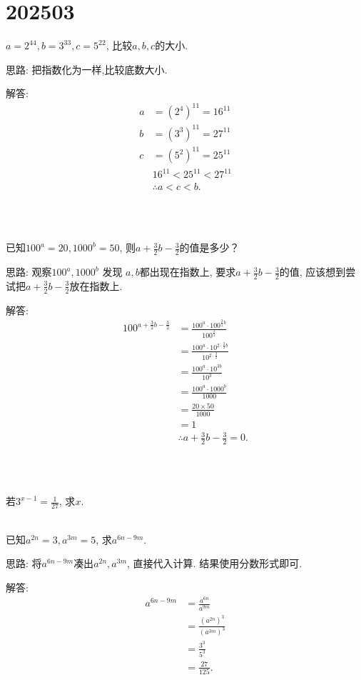 \section{202503}

\item{
    $a=2^{44}, b=3^{33}, c=5^{22}$, 比较$a, b, c$的大小.

    \fangsong{}
    思路: 把指数化为一样,比较底数大小.

    解答: 
    \begin{align*}
        a &= (2^4)^{11} = 16^{11}\\
        b &= (3^3)^{11} = 27^{11}\\
        c &= (5^2)^{11} = 25^{11}\\
        & 16^{11} < 25^{11} < 27^{11}\\
        &\therefore a < c < b.
    \end{align*}
}
\\ \\
\item{
    已知$100^a=20, 1000^b=50$, 则$a+\frac{3}{2}b-\frac{3}{2}$的值是多少？

     \fangsong{}
     思路: 观察$100^a, 1000^b$ 发现 $a,b$都出现在指数上, 要求$a+\frac{3}{2}b-\frac{3}{2}$的值, 应该想到尝试把$a+\frac{3}{2}b-\frac{3}{2}$放在指数上.
 
     解答: 
     \begin{align*}
         100^{a+\frac{3}{2}b-\frac{3}{2}} &= \frac{100^a\cdot 100^{\frac{3}{2}b}}{100^\frac{3}{2}}\\
         &= \frac{100^a\cdot 10^{2\cdot \frac{3}{2}b}}{10^{2\cdot\frac{3}{2}}}\\
         &= \frac{100^a\cdot 10^{3b}} {10^{3}}\\
         &= \frac{100^a\cdot 1000^{b}} {1000}\\
         &= \frac{20\times 50} {1000}\\
         &= 1\\
         &\therefore a+\frac{3}{2}b-\frac{3}{2} = 0.
     \end{align*}
}
\\ \\
\item{
    若$3^{x-1}=\frac{1}{27}$, 求$x$.
}
\\ \\
\item{
    已知$a^{2n}=3, a^{3m}=5$, 求$a^{6n-9m}$.

    \fangsong{}
    思路: 将$a^{6n-9m}$凑出$a^{2n}, a^{3m}$, 直接代入计算. 结果使用分数形式即可.

    解答: 
    \begin{align*}
        a^{6n-9m} &= \frac{a^{6n}}{a^{9m}}\\
        &= \frac{(a^{2n})^3} {(a^{3m})^3}\\
        &= \frac{3^3} {5^3}\\
        &= \frac{27} {125}.
    \end{align*}
}

